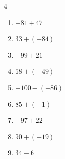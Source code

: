 \begin{multicols}{4}
\begin{enumerate}
  \item $-81+47$

        \phantom{$=-34$}

  \item $33+(-84)$

        \phantom{$=-51$}

  \item $-99+21$

        \phantom{$=-78$}

  \item $68+(-49)$

        \phantom{$=19$}

  \item $-100-(-86)$

        \phantom{$=-14$}

  \item $85+(-1)$

        \phantom{$=84$}

  \item $-97+22$

        \phantom{$=-75$}

  \item $90+(-19)$

        \phantom{$=71$}

  \item $34-6$

        \phantom{$=28$}

\end{enumerate}
\end{multicols}

\newpage
\resetdrill

